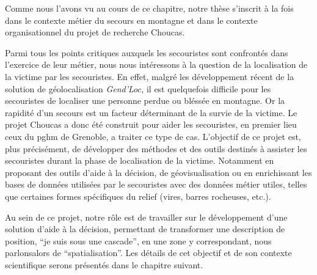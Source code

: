 Comme nous l'avons vu au cours de ce chapitre, notre thèse s'inscrit à
la fois dans le contexte métier du secours en montagne et dans
le contexte organisationnel du projet de recherche Choucas.

Parmi tous les points critiques auxquels les secouristes sont
confrontés dans l'exercice de leur métier, nous nous intéressons à la
question de la localisation de la victime par les secouristes. En
effet, malgré les développement récent de la solution de
géolocalisation \emph{Gend'Loc,} il est quelquefois difficile pour les
secouristes de localiser une personne perdue ou bléssée en
montagne. Or la rapidité d'un secours est un facteur déterminant de la
survie de la victime. Le projet Choucas a donc été construit pour
aider les secouristes, en premier lieu ceux du \ac{pghm} de Grenoble,
a traiter ce type de cas. L'objectif de ce projet est, plus
précisément, de développer des méthodes et des outils destinés à
assister les secouristes durant la phase de localisation de la
victime. Notamment en proposant des outils d'aide à la décision, de
géovisualisation ou en enrichissant les bases de données utilisées par
le secouristes avec des données métier utiles, telles que certaines
formes spécifiques du relief (\eg vires, barres rocheuses, etc.).

Au sein de ce projet, notre rôle est de travailler sur le
développement d'une solution d'aide à la décision, permettant de
transformer une description de position, \eg \enquote{je suis sous une
  cascade}, en une zone y correspondant, nous parlonsalors de
\enquote{spatialisation}. Les détails de cet objectif et de son
contexte scientifique serons présentés dans le chapitre suivant.

